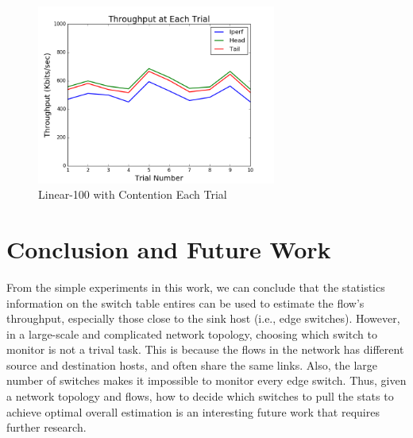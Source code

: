 \documentclass[12pt]{article}
\begin{document}
\begin{figure}
  \centering
  \includegraphics[width=0.7\textwidth]{544_data/trial.png}
  \caption{Linear-100 with Contention Each Trial}
  \label{fig:trial}
\end{figure}

\section{Conclusion and Future Work}

From the simple experiments in this work, we can conclude that the statistics information on the switch table entires can be used to estimate the flow's throughput, especially those close to the sink host (i.e., edge switches). However, in a large-scale and complicated network topology, choosing which switch to monitor is not a trival task. This is because the flows in the network has different source and destination hosts, and often share the same links. Also, the large number of switches makes it impossible to monitor every edge switch. Thus, given a network topology and flows, how to decide which switches to pull the stats to achieve optimal overall estimation is an interesting future work that requires further research.




\end{document}
